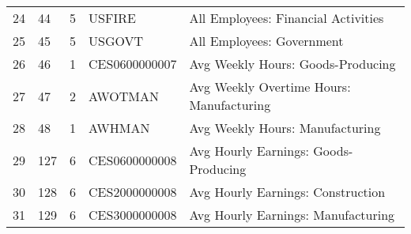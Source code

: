 \begin{table}[ht]
\begin{tabular}{lllll}
24 & 44 & 5 & USFIRE & All Employees: Financial Activities \\
25 & 45 & 5 & USGOVT & All Employees: Government \\
26 & 46 & 1 & CES0600000007 & Avg Weekly Hours: Goods-Producing \\
27 & 47 & 2 & AWOTMAN & Avg Weekly Overtime Hours: Manufacturing \\
28 & 48 & 1 & AWHMAN & Avg Weekly Hours: Manufacturing \\
29 & 127 & 6 & CES0600000008 & Avg Hourly Earnings: Goods-Producing \\
30 & 128 & 6 & CES2000000008 & Avg Hourly Earnings: Construction \\
31 & 129 & 6 & CES3000000008 & Avg Hourly Earnings: Manufacturing \\

\bottomrule
\end{tabular}  
\end{table} 